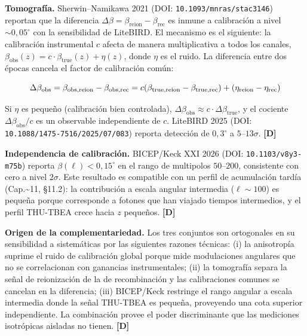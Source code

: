 ﻿\documentclass[11pt,letterpaper]{article}
\begin{document}
\textbf{Tomografía.} Sherwin--Namikawa 2021 (DOI: \texttt{10.1093/mnras/stac3146}) reportan que la diferencia $\Delta\beta = \beta_{\text{reion}} - \beta_{\text{rec}}$ es inmune a calibración a nivel $\sim 0{,}05^\circ$ con la sensibilidad de LiteBIRD. El mecanismo es el siguiente: la calibración instrumental $c$ afecta de manera multiplicativa a todos los canales, $\beta_{\text{obs}}(z) = c \cdot \beta_{\text{true}}(z) + \eta(z)$, donde $\eta$ es el ruido. La diferencia entre dos épocas cancela el factor de calibración común:

\begin{equation*}
  \resizebox{\ifdim\width>\linewidth \linewidth\else\width\fi}{!}{$\displaystyle \Delta\beta_{\text{obs}} = \beta_{\text{obs,reion}} - \beta_{\text{obs,rec}} = c(\beta_{\text{true,reion}} - \beta_{\text{true,rec}}) + (\eta_{\text{reion}} - \eta_{\text{rec}})$}
\end{equation*}

Si $\eta$ es pequeño (calibración bien controlada), $\Delta\beta_{\text{obs}} \approx c \cdot \Delta\beta_{\text{true}}$, y el cociente $\Delta\beta_{\text{obs}}/c$ es un observable independiente de $c$. LiteBIRD 2025 (DOI: \texttt{10.1088/1475-7516/2025/07/083}) reporta detección de $0{,}3^\circ$ a $5$--$13\sigma$. \textbf{[D]}

\textbf{Independencia de calibración.} BICEP/Keck XXI 2026 (DOI: \texttt{10.1103/v8y3-m75b}) reporta $\beta(\ell) < 0{,}15^\circ$ en el rango de multipolos $50$--$200$, consistente con cero a nivel $2\sigma$. Este resultado es compatible con un perfil de acumulación tardía (Cap.\textasciitilde{}11, §11.2): la contribución a escala angular intermedia ($\ell \sim 100$) es pequeña porque corresponde a fotones que han viajado tiempos intermedios, y el perfil THU-TBEA crece hacia $z$ pequeños. \textbf{[D]}

\textbf{Origen de la complementariedad.} Los tres conjuntos son ortogonales en su sensibilidad a sistemáticas por las siguientes razones técnicas: (i) la anisotropía suprime el ruido de calibración global porque mide modulaciones angulares que no se correlacionan con ganancias instrumentales; (ii) la tomografía separa la señal de reionización de la de recombinación y las calibraciones comunes se cancelan en la diferencia; (iii) BICEP/Keck restringe el rango angular a escala intermedia donde la señal THU-TBEA es pequeña, proveyendo una cota superior independiente. La combinación provee el poder discriminante que las mediciones isotrópicas aisladas no tienen. \textbf{[D]}
\end{document}
